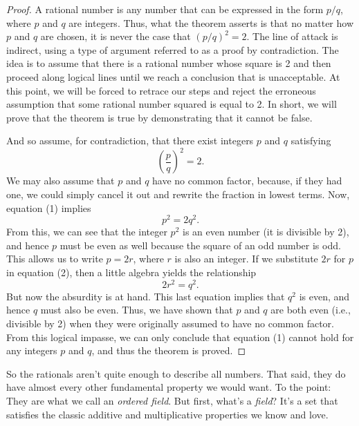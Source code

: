 \documentclass[11pt,twoside=off,numbers=noenddot]{scrbook}
\begin{document}
\begin{proof}
    A rational number is any number that can be expressed in the form $p/q$, where $p$ and $q$ are integers. Thus, what the theorem asserts is that no matter how $p$ and $q$ are chosen, it is never the case that $(p/q)^2 = 2$. The line of attack is indirect, using a type of argument referred to as a proof by contradiction. The idea is to assume that there is a rational number whose square is 2 and then proceed along logical lines until we reach a conclusion that is unacceptable. At this point, we will be forced to retrace our steps and reject the erroneous assumption that some rational number squared is equal to 2. In short, we will prove that the theorem is true by demonstrating that it cannot be false.

    And so assume, for contradiction, that there exist integers $p$ and $q$ satisfying
    \[ \left(\frac{p}{q}\right)^2 = 2. \tag{1} \]
    We may also assume that $p$ and $q$ have no common factor, because, if they had one, we could simply cancel it out and rewrite the fraction in lowest terms. Now, equation (1) implies
    \[ p^2 = 2q^2. \tag{2} \]
    From this, we can see that the integer $p^2$ is an even number (it is divisible by 2), and hence $p$ must be even as well because the square of an odd number is odd. This allows us to write $p = 2r$, where $r$ is also an integer. If we substitute $2r$ for $p$ in equation (2), then a little algebra yields the relationship
    \[ 2r^2 = q^2. \]
    But now the absurdity is at hand. This last equation implies that $q^2$ is even, and hence $q$ must also be even. Thus, we have shown that $p$ and $q$ are both even (i.e., divisible by 2) when they were originally assumed to have no common factor. From this logical impasse, we can only conclude that equation (1) cannot hold for any integers $p$ and $q$, and thus the theorem is proved.
\end{proof}

\begin{remark}
    So the rationals aren't quite enough to describe all numbers. That said, they do have almost every other fundamental property we would want. To the point: They are what we call an \textit{ordered field}. But first, what's a \textit{field}? It's a set that satisfies the classic additive and multiplicative properties we know and love.
\end{remark}
\end{document}
